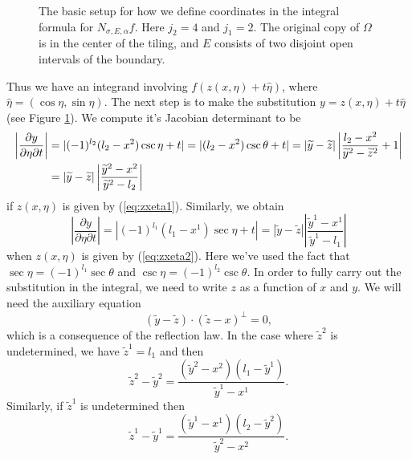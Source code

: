 \documentclass[10pt]{amsart}
\theoremstyle{definition}
\theoremstyle{definition}
\theoremstyle{definition}
\begin{document}
\begin{figure}
\centering
\def \svgwidth{0.7\columnwidth}

\caption{The basic setup for how we define coordinates in the integral formula for $N_{\sigma, E, \alpha}f$. Here $j_{2} =4$ and $j_{1}=2$. The original copy of $\Omega$ is in the center of the tiling, and $E$ consists of two disjoint open intervals of the boundary.\label{fig:substitution}}
\end{figure}
Thus we have an integrand involving $f(z(x,\eta) + t\widehat{\eta})$, where $\widehat{\eta} = (\cos{\eta},\sin{\eta})$. The next step is to make the substitution $y = z(x,\eta) + t\widehat{\eta}$ (see Figure \ref{fig:substitution}). We compute it's Jacobian determinant to be
\begin{align}
\left| \frac{\partial y}{\partial \eta \partial t} \right| & = |(-1)^{l_{2}}(l_{2}-x^{2})\csc{\eta} + t| = |(l_{2}-x^{2})\csc{\theta} + t| = |\widetilde{y}-\widetilde{z}|\left| \frac{l_{2}-x^{2}}{\widetilde{y}^{2} - \widetilde{z}^{2}} + 1 \right|\notag\\
& = |\widetilde{y}-\widetilde{z}|\left| \frac{\widetilde{y}^{2}-x^{2}}{\widetilde{y}^{2} - l_{2}} \right|
\end{align}
if $z(x,\eta)$ is given by (\ref{eq:zxeta1}). Similarly, we obtain
\begin{equation*}
\left| \frac{\partial y}{\partial \eta \partial t} \right| = |(-1)^{l_{1}}(l_{1} -x^{1})\sec{\eta} + t | = |\widetilde{y}-\widetilde{z}|\left| \frac{\widetilde{y}^{1}-x^{1}}{\widetilde{y}^{1} - l_{1}} \right|
\end{equation*}
when $z(x,\eta)$ is given by (\ref{eq:zxeta2}). Here we've used the fact that $\sec{\eta} = (-1)^{l_{1}}\sec{\theta}$ and $\csc{\eta} = (-1)^{l_{2}} \csc{\theta}$. In order to fully carry out the substitution in the integral, we need to write $z$ as a function of $x$ and $y$. We will need the auxiliary equation
\begin{equation}
(\widetilde{y} - \widetilde{z}) \cdot (\widetilde{z} - x)^{\perp} = 0,
\end{equation}
which is a consequence of the reflection law. In the case where $\widetilde{z}^{2}$ is undetermined, we have $\widetilde{z}^{1} = l_{1}$ and then
\begin{equation}
\widetilde{z}^{2} - \widetilde{y}^{2} = \frac{(\widetilde{y}^{2}-x^{2})(l_{1} - \widetilde{y}^{1})}{\widetilde{y}^{1} - x^{1}}.
\end{equation}
Similarly, if $\widetilde{z}^{1}$ is undetermined then
\begin{equation}
\widetilde{z}^{1} - \widetilde{y}^{1} = \frac{(\widetilde{y}^{1} - x^{1})(l_{2} - \widetilde{y}^{2})}{\widetilde{y}^{2} - x^{2}}.
\end{equation}
\end{document}
